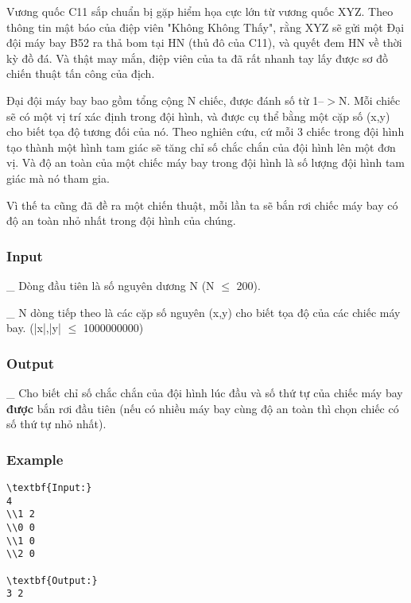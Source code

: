 



   Vương quốc C11 sắp chuẩn bị gặp hiểm họa cực lớn từ vương quốc XYZ. Theo thông tin mật báo của điệp viên "Không Không Thấy", rằng XYZ sẽ gửi một Đại đội máy bay B52 ra thả bom tại HN (thủ đô của C11), và quyết đem HN về thời kỳ đồ đá. Và thật may mắn, điệp viên của ta đã rất nhanh tay lấy được sơ đồ chiến thuật tấn công của địch.  

   Đại đội máy bay bao gồm tổng cộng N chiếc, được đánh số từ 1--$>$N. Mỗi chiếc sẽ có một vị trí xác định trong đội hình, và được cụ thể bằng một cặp số (x,y) cho biết tọa độ tương đối của nó. Theo nghiên cứu, cứ mỗi 3 chiếc trong đội hình tạo thành một hình tam giác sẽ tăng chỉ số chắc chắn của đội hình lên một đơn vị. Và độ an toàn của một chiếc máy bay trong đội hình là số lượng đội hình tam giác mà nó tham gia.  

   Vì thế ta cũng đã đề ra một chiến thuật, mỗi lần ta sẽ bắn rơi chiếc máy bay có độ an toàn nhỏ nhất trong đội hình của chúng.  

\subsubsection{   Input  }

   \_ Dòng đầu tiên là số nguyên dương N (N $\le$ 200).  

   \_ N dòng tiếp theo là các cặp số nguyên (x,y) cho biết tọa độ của các chiếc máy bay. (|x|,|y| $\le$ 1000000000)  

\subsubsection{   Output  }

   \_ Cho biết   chỉ số chắc chắn   của đội hình lúc đầu và số thứ tự của chiếc máy bay   \textbf{    được   }bắn rơi đầu tiên   (nếu có nhiều máy bay cùng độ an toàn thì chọn chiếc có số thứ tự nhỏ nhất).  

\subsubsection{   Example  }
\begin{verbatim}
\textbf{Input:}
4
\\1 2
\\0 0 
\\1 0
\\2 0

\textbf{Output:}
3 2
\end{verbatim}
